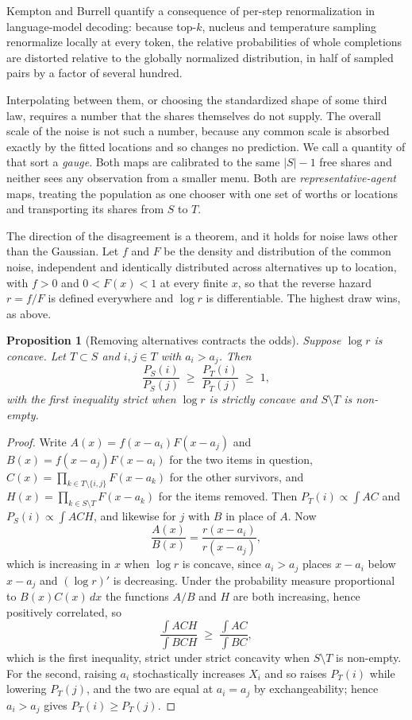 \documentclass[11pt]{article}
\theoremstyle{italichead}
\newtheorem{proposition}{Proposition}
\begin{document}
Kempton and Burrell \cite{kemptonburrell2025} quantify a consequence of per-step
renormalization in language-model decoding: because top-$k$, nucleus and temperature sampling
renormalize locally at every token, the relative probabilities of whole completions are distorted
relative to the globally normalized distribution, in half of sampled pairs by a factor of several
hundred.

Interpolating between them, or choosing the standardized shape of some third law, requires a
number that the shares themselves do not supply. The overall scale of the noise is not such a
number, because any common scale is absorbed exactly by the fitted locations and so changes no
prediction. We call a quantity of that sort a \emph{gauge}. Both maps are calibrated
to the same $|S|-1$ free shares and neither sees any observation from a smaller menu. Both are
\emph{representative-agent} maps, treating the population as one chooser with one set of
worths or locations and transporting its shares from $S$ to $T$.

The direction of the disagreement is a theorem, and it holds for noise laws other than
the Gaussian. Let $f$ and $F$ be the density and distribution of the common noise, independent and
identically distributed across alternatives up to location, with $f > 0$ and $0 < F(x) < 1$ at
every finite $x$, so that the reverse hazard $r = f/F$ is defined everywhere and $\log r$ is
differentiable. The highest draw wins, as above.

\begin{proposition}[Removing alternatives contracts the odds]
\label{prop:contraction}
Suppose $\log r$ is concave. Let $T \subset S$ and $i,j \in T$ with $a_i > a_j$. Then
\[
\frac{P_S(i)}{P_S(j)} \;\ge\; \frac{P_T(i)}{P_T(j)} \;\ge\; 1,
\]
with the first inequality strict when $\log r$ is strictly concave and $S \setminus T$ is
non-empty.
\end{proposition}

\begin{proof}
Write $A(x) = f(x-a_i)F(x-a_j)$ and $B(x) = f(x-a_j)F(x-a_i)$ for the two items in
question, $C(x) = \prod_{k \in T \setminus \{i,j\}} F(x-a_k)$ for the other survivors, and
$H(x) = \prod_{k \in S \setminus T} F(x-a_k)$ for the items removed. Then
$P_T(i) \propto \int A C$ and $P_S(i) \propto \int A C H$, and likewise for $j$
with $B$ in place of $A$. Now
\[
\frac{A(x)}{B(x)} = \frac{r(x-a_i)}{r(x-a_j)},
\]
which is increasing in $x$ when $\log r$ is concave, since $a_i > a_j$ places $x-a_i$ below
$x-a_j$ and $(\log r)'$ is decreasing. Under the probability measure proportional to
$B(x)C(x)\,dx$ the functions $A/B$ and $H$ are both increasing, hence positively
correlated, so
\[
\frac{\int A C H}{\int B C H} \;\ge\; \frac{\int A C}{\int B C},
\]
which is the first inequality, strict under strict concavity when $S \setminus T$ is
non-empty. For the second, raising $a_i$ stochastically increases $X_i$ and so raises
$P_T(i)$ while lowering $P_T(j)$, and the two are equal at $a_i = a_j$ by
exchangeability; hence $a_i > a_j$ gives $P_T(i) \ge P_T(j)$.
\end{proof}
\end{document}
